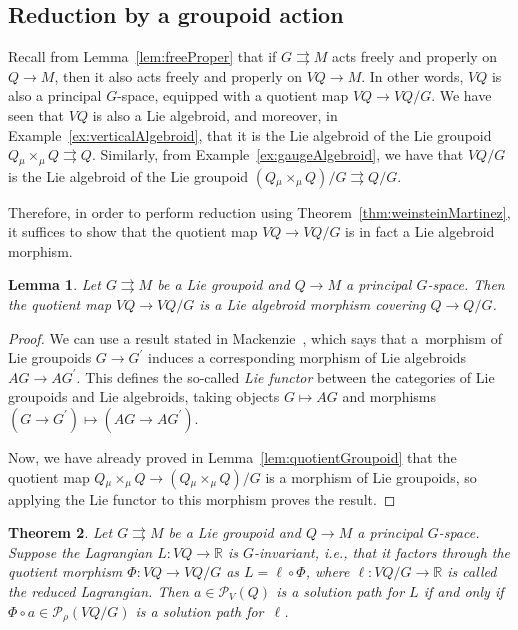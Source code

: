 \documentclass[pdftex]{sigma}
\numberwithin{equation}{section}
\newtheorem{Theorem}{Theorem}[section]
\newtheorem{Lemma}[Theorem]{Lemma}
\begin{document}
\subsection{Reduction by a groupoid action}

Recall from Lemma~\ref{lem:freeProper} that if $ G \rightrightarrows M $ acts freely and properly on $ Q \rightarrow M $, then it also acts freely and properly on $ V Q \rightarrow M $. In other words, $ V Q $ is also a principal $G$-space, equipped with a quotient map $ V Q \rightarrow V Q / G $. We have seen that $ V Q $ is also a Lie algebroid, and moreover, in Example~\ref{ex:verticalAlgebroid}, that it is the Lie algebroid of the Lie groupoid $ Q \mathbin{ _\mu \times _\mu } Q \rightrightarrows Q $. Similarly, from Example~\ref{ex:gaugeAlgebroid}, we have that $ V Q / G $ is the Lie algebroid of the Lie groupoid $ (Q \mathbin{ _\mu \times _\mu } Q)/G \rightrightarrows Q/G $.

Therefore, in order to perform reduction using Theorem~\ref{thm:weinsteinMartinez}, it suf\/f\/ices to show that the quotient map $ V Q \rightarrow V Q / G $ is in fact a Lie algebroid morphism.

\begin{Lemma} \label{lem:quotientMorphism}
Let $ G \rightrightarrows M $ be a Lie groupoid and $ Q \rightarrow M $ a principal $G$-space. Then the quotient map $ V Q \rightarrow V Q / G $ is a Lie algebroid morphism covering $ Q \rightarrow Q / G $.
\end{Lemma}

\begin{proof}We can use a result stated in Mackenzie~\cite[Proposition~4.3.4]{Mackenzie2005}, which says that a~morphism of Lie groupoids $ G \rightarrow G ^\prime $ induces a corresponding morphism of Lie algebroids $ A G \rightarrow A G ^\prime $. This def\/ines the so-called \emph{Lie functor} between the categories of Lie groupoids and Lie algebroids, taking objects $ G \mapsto A G $ and morphisms $ ( G \rightarrow G ^\prime ) \mapsto ( A G \rightarrow A G
 ^\prime ) $.

Now, we have already proved in Lemma~\ref{lem:quotientGroupoid} that the quotient map $ Q \mathbin{ _\mu \times _\mu } Q \rightarrow ( Q \mathbin{ _\mu \times _\mu } Q ) / G $ is a morphism of Lie groupoids, so applying the Lie functor to this morphism proves the result.
\end{proof}

\begin{Theorem} \label{thm:reduction}
Let $ G \rightrightarrows M $ be a Lie groupoid and $ Q \rightarrow M $ a principal $G$-space. Suppose the Lagrangian $ L \colon V Q \rightarrow \mathbb{R} $ is $G$-invariant, i.e., that it factors through the quotient morphism $ \Phi \colon V Q \rightarrow V Q / G $ as $ L = \ell \circ \Phi $, where $ \ell \colon V Q / G \rightarrow \mathbb{R} $ is called the reduced Lagrangian. Then $a \in \mathcal{P} _V (Q) $ is a solution path for $L$ if and only if $ \Phi \circ a \in \mathcal{P} _\rho ( V Q / G ) $ is a solution path for~$ \ell $.
\end{Theorem}
\end{document}
